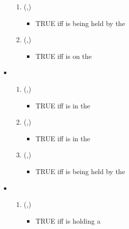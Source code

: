 \begin{itemize}
\begin{enumerate}[resume]
        \item {}(,) 
            \begin{itemize}
                \item TRUE iff  is being held by the 
            \end{itemize}
  
        \item {}(,) 
            \begin{itemize}
                \item TRUE iff  is on the 
            \end{itemize}
  \end{enumerate}

\item {}
    \begin{enumerate}[resume]
        \item {}(,)
            \begin{itemize}
                \item TRUE iff  is in the 
            \end{itemize}
    	
        \item {}(,) 
            \begin{itemize}
                \item TRUE iff  is in the 
            \end{itemize}
    
        \item {}(,) 
            \begin{itemize}
                \item TRUE iff  is being held by the 
            \end{itemize}
    \end{enumerate}

\item {}
    \begin{enumerate}[resume]
        \item {}(,) 
            \begin{itemize}
                \item TRUE iff  is holding a 
            \end{itemize}
    

\end{enumerate}
\end{itemize}
